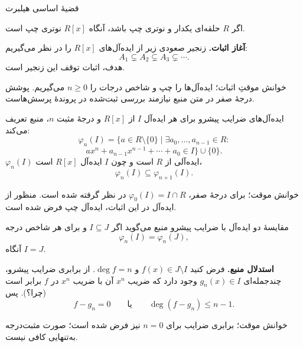 \begin{frame}[t]{قضیهٔ اساسی هیلبرت}
    \label{lec12:hilbert-statement}
    \begin{theorem}
        اگر $R$ حلقه‌ای یکدار و نوتری چپ باشد، آنگاه $R[x]$ نوتری چپ است.
    \end{theorem}
    \textbf{آغاز اثبات.}
    زنجیر صعودی زیر از ایده‌آل‌های $R[x]$ را در نظر می‌گیریم:
    \[
        A_1\subsetneq A_2\subsetneq A_3\subsetneq\cdots.
    \]
    هدف، اثبات توقف این زنجیر است.
    \medskip

    \begin{alertblock}{خوانش موقتِ اثبات؛ }
        ایده‌آل‌ها را چپ و شاخص درجات را $n\geq0$ می‌گیریم.
        پوشش درجهٔ صفر در متن منبع نیازمند بررسی ثبت‌شده در پروندهٔ پرسش‌هاست.
    \end{alertblock}
\end{frame}

\begin{frame}[t]{ایده‌آل‌های ضرایب پیشرو}
    \label{lec12:leading-coefficients}
    برای هر ایده‌آل $I$ از $R[x]$ و درجهٔ مثبت $n$، منبع تعریف می‌کند:
    \[
        \varphi_n(I)=\{a\in R\setminus\{0\}\mid
        \exists a_0,\ldots,a_{n-1}\in R:
    \]
    \[
        ax^n+a_{n-1}x^{n-1}+\cdots+a_0\in I\}\cup\{0\}.
    \]
    $\varphi_n(I)$ ایده‌آلی از $R$ است و چون $I$ ایده‌آل $R[x]$ است،
    \[
        \varphi_n(I)\subseteq\varphi_{n+1}(I).
    \]
    \begin{alertblock}{خوانش موقت؛ }
        برای درجهٔ صفر، $\varphi_0(I)=I\cap R$ در نظر گرفته شده است.
        منظور از ایده‌آل در این اثبات، ایده‌آل چپ فرض شده است.
    \end{alertblock}
\end{frame}

\begin{frame}[t]{مقایسهٔ دو ایده‌آل با ضرایب پیشرو}
    \label{lec12:coefficient-comparison}
    منبع می‌گوید اگر $I\subseteq J$ و برای هر شاخص درجه
    \[
        \varphi_n(I)=\varphi_n(J),
    \]
    آنگاه $I=J$.
    \medskip

    \textbf{استدلال منبع.} فرض کنید $f(x)\in J\setminus I$ و $\deg f=n$.
    از برابری ضرایب پیشرو، چندجمله‌ای $g_n(x)\in I$ وجود دارد که ضریب
    $x^n$ آن با ضریب $x^n$ در $f$ برابر است (چرا؟). پس
    \[
        f-g_n=0\qquad\text{یا}\qquad\deg(f-g_n)\leq n-1.
    \]
    \begin{alertblock}{خوانش موقت؛ }
        برابری ضرایب برای $n=0$ نیز فرض شده است؛ صورت مثبت‌درجه به‌تنهایی کافی نیست.
    \end{alertblock}
\end{frame}

